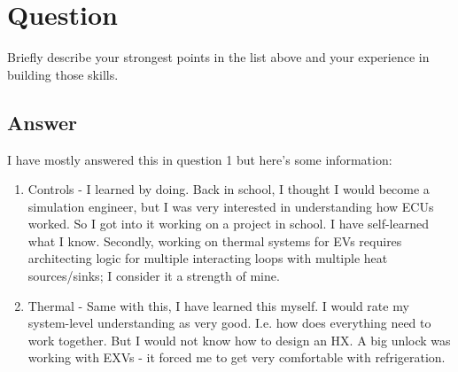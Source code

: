 \section{Question}
Briefly describe your strongest points in the list above and your experience in building
those skills.

\subsection *{Answer}
I have mostly answered this in question 1 but here's some information:
\begin{enumerate}
   \item Controls - I learned by doing. Back in school, I thought I would become a simulation engineer, but I was very interested in understanding how ECUs worked. So I got into it working on a project in school. I have self-learned what I know. Secondly, working on thermal systems for EVs requires architecting logic for multiple interacting loops with multiple heat sources/sinks; I consider it a strength of mine.
   \item Thermal - Same with this, I have learned this myself. I would rate my system-level understanding as very good. I.e. how does everything need to work together. But I would not know how to design an HX. A big unlock was working with EXVs - it forced me to get very comfortable with refrigeration.
\end{enumerate}